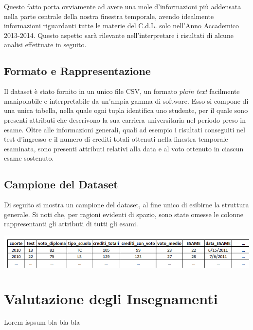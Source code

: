 Questo fatto porta ovviamente ad avere una mole d'informazioni più addensata nella parte centrale della nostra finestra temporale, avendo idealmente informazioni riguardanti tutte le materie del C.d.L. solo nell'Anno Accademico 2013-2014. Questo aspetto sarà rilevante nell'interpretare i risultati di alcune analisi effettuate in seguito.

\subsection{Formato e Rappresentazione}

Il dataset è stato fornito in un unico file CSV, un formato \textit{plain text} facilmente manipolabile e interpretabile da un'ampia gamma di software. Esso si compone di una unica tabella, nella quale ogni tupla identifica uno studente, per il quale sono presenti attributi che descrivono la sua carriera universitaria nel periodo preso in esame. Oltre alle informazioni generali, quali ad esempio i risultati conseguiti nel test d'ingresso e il numero di crediti totali ottenuti nella finestra temporale esaminata, sono presenti attributi relativi alla data e al voto ottenuto in ciascun esame sostenuto.

\subsection{Campione del Dataset}

Di seguito si mostra un campione del dataset, al fine unico di esibirne la struttura generale. Si noti che, per ragioni evidenti di spazio, sono state omesse le colonne rappresentanti gli attributi di tutti gli esami.

\begin{center}
	\includegraphics[scale=0.5]{../raw/stud_sample.png}
\end{center}

\section{Valutazione degli Insegnamenti}
	Lorem ispsum bla bla bla

